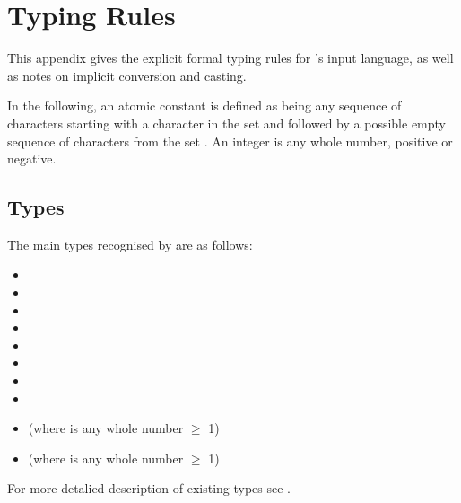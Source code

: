 
\chapter{Typing Rules}
This appendix gives the explicit formal typing rules for {\nusmv}'s
input language, as well as notes on implicit conversion and casting.

In the following, an atomic constant is defined as being any sequence
of characters starting with a character in the set 
and followed by a possible empty sequence of characters from the set
. An integer is any whole
number, positive or negative.

\section{Types}

The main types recognised by \nusmv are as follows:
\begin{itemize}
\item[] \Boolean 
\item[] \Integer 
\item[] \SymbEnum 
\item[] \IntSymbEnum 
\item[] \BoolSet
\item[] \IntSet 
\item[] \SymbSet 
\item[] \IntSymbSet 
\item[] \UWord[N] (where  is any whole number $\geq$ 1)
\item[] \SWord[N] (where  is any whole number $\geq$ 1)
\end{itemize}

For more detalied description of existing types see .
 
